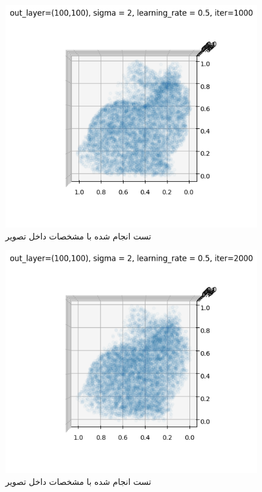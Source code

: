 \documentclass{article}
\begin{document}
\begin{figure}[!h]
    \centering\includegraphics[scale=.65]{./p1-10}
    \caption{تست انجام شده با مشخصات داخل تصویر}\label{fig.110}
\end{figure}

\begin{figure}[!h]
    \centering\includegraphics[scale=.65]{./p1-11}
    \caption{تست انجام شده با مشخصات داخل تصویر}\label{fig.111}
\end{figure}
\end{document}
